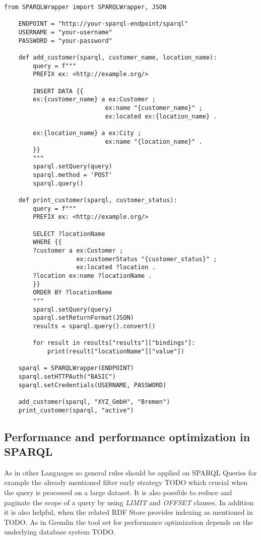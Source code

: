 \begin{lstlisting}[caption={Interact with SPARQL and Python}, label={lst:pythonSPARQL}]
	from SPARQLWrapper import SPARQLWrapper, JSON

	ENDPOINT = "http://your-sparql-endpoint/sparql"
	USERNAME = "your-username"
	PASSWORD = "your-password"

	def add_customer(sparql, customer_name, location_name):
		query = f"""
		PREFIX ex: <http://example.org/>

		INSERT DATA {{
		ex:{customer_name} a ex:Customer ;
							ex:name "{customer_name}" ;
							ex:located ex:{location_name} .
							
		ex:{location_name} a ex:City ;
							ex:name "{location_name}" .
		}}
		"""
		sparql.setQuery(query)
		sparql.method = 'POST'
		sparql.query()

	def print_customer(sparql, customer_status):
		query = f"""
		PREFIX ex: <http://example.org/>

		SELECT ?locationName
		WHERE {{
		?customer a ex:Customer ;
					ex:customerStatus "{customer_status}" ;
					ex:located ?location .
		?location ex:name ?locationName .
		}}
		ORDER BY ?locationName
		"""
		sparql.setQuery(query)
		sparql.setReturnFormat(JSON)
		results = sparql.query().convert()

		for result in results["results"]["bindings"]:
			print(result["locationName"]["value"])

	sparql = SPARQLWrapper(ENDPOINT)
	sparql.setHTTPAuth("BASIC")
	sparql.setCredentials(USERNAME, PASSWORD)

	add_customer(sparql, "XYZ_GmbH", "Bremen")
	print_customer(sparql, "active")
\end{lstlisting}
\subsection{Performance and performance optimization in SPARQL}
As in other Languages so general rules should be applied on SPARQL Queries for example
the already mentioned filter early strategy TODO which crucial when the query is 
processed on a large dataset. 
It is also possible to reduce and paginate the scope of a query by using \textit{LIMIT} and \textit{OFFSET}
clauses.
In addition it is also helpful, when the related RDF Store provides indexing as mentioned in TODO.
As in Gremlin the tool set for performance optimization depends on the underlying database system TODO.
